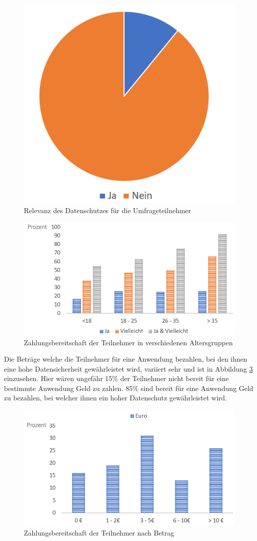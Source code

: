 \begin{figure}
	\centering
	\includegraphics[width=0.5\linewidth]{Picture/umfrage_datenschutz}
	\caption[Relevanz des Datenschutzes für die Umfrageteilnehmer]{Relevanz des Datenschutzes für die Umfrageteilnehmer}
	\label{fig:umfrage_datenschutz}
\end{figure}



\begin{figure}[h!]
	\centering
	\includegraphics[width=0.7\linewidth]{Picture/umfrage_geld_gruppen}
	\caption[Zahlungsbereitschaft der Teilnehmer in verschiedenen Altersgruppen]{Zahlungsbereitschaft der Teilnehmer in verschiedenen Altersgruppen}
	\label{fig:umfrage_geld_gruppen}
\end{figure}

Die Beträge welche die Teilnehmer für eine Anwendung bezahlen, bei den ihnen eine hohe Datensicherheit gewährleistet wird, variiert sehr und ist in Abbildung \ref{fig:umfrage_betrag} einzusehen. Hier wären ungefähr 15\% der Teilnehmer nicht bereit für eine bestimmte Anwendung Geld zu zahlen. 85\% sind bereit für eine Anwendung Geld zu bezahlen, bei welcher ihnen ein hoher Datenschutz gewährleistet wird. 

\begin{figure}[h!]
	\centering
	\includegraphics[width=0.7\linewidth]{Picture/umfrage_betrag}
	\caption[Zahlungsbereitschaft der Teilnehmer nach Betrag]{Zahlungsbereitschaft der Teilnehmer nach Betrag}
	\label{fig:umfrage_betrag}
\end{figure}

